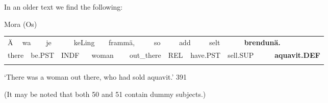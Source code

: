 \begin{styleBodyTextFirst}
In an older text we find the following:

\end{styleBodyTextFirst}

\begin{listWWNumileveli}
\item 

\begin{styleExample}
\label{bkm:Ref123968062}Mora (Os)

\end{styleExample}

\end{listWWNumileveli}

\begin{tabular}{llllllllllllllllll}
\lsptoprule
Ä & \multicolumn{2}{l}{wa

} & \multicolumn{2}{l}{je

} & \multicolumn{2}{l}{keLing

} & \multicolumn{2}{l}{frammä,

} & \multicolumn{2}{l}{so

} & \multicolumn{2}{l}{add

} & \multicolumn{2}{l}{selt

} & \multicolumn{2}{l}{{\bfseries brendunä.}

} & \\
\multicolumn{2}{l}{there

} & \multicolumn{2}{l}{be.PST

} & \multicolumn{2}{l}{INDF

} & \multicolumn{2}{l}{woman

} & \multicolumn{2}{l}{out\_there

} & \multicolumn{2}{l}{REL

} & \multicolumn{2}{l}{have.PST

} & \multicolumn{2}{l}{sell.SUP

} & \multicolumn{2}{l}{{\bfseries aquavit.DEF}

}\\
\lspbottomrule
\end{tabular}

\begin{styleTranslation}
‘There was a woman out there, who had sold aquavit.’ 391

\end{styleTranslation}

\begin{styleBodyTextFirst}
(It may be noted that both 50 and 51 contain dummy subjects.)

\end{styleBodyTextFirst}

